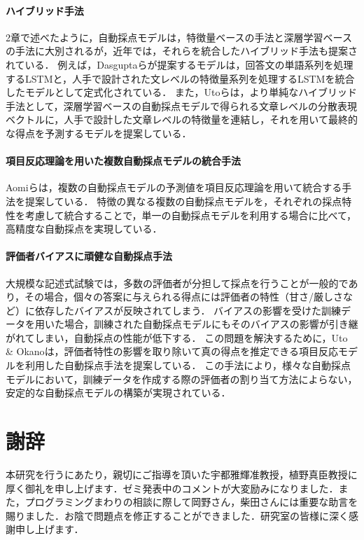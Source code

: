 \documentclass[a4paper,12pt,oneside,openany]{jsbook}
\begin{document}
\subsubsection*{ハイブリッド手法}

2章で述べたように，自動採点モデルは，特徴量ベースの手法と深層学習ベースの手法に大別されるが，近年では，それらを統合したハイブリッド手法も提案されている．
例えば，Dasguptaら\cite{Hybridmodel1}が提案するモデルは，回答文の単語系列を処理するLSTMと，人手で設計された文レベルの特徴量系列を処理するLSTMを統合したモデルとして定式化されている．
また，Utoら\cite{Hybridmodel2}は，より単純なハイブリッド手法として，深層学習ベースの自動採点モデルで得られる文章レベルの分散表現ベクトルに，人手で設計した文章レベルの特徴量を連結し，それを用いて最終的な得点を予測するモデルを提案している．

\subsubsection*{項目反応理論を用いた複数自動採点モデルの統合手法}

Aomiら\cite{asag6}\cite{aomi2}は，複数の自動採点モデルの予測値を項目反応理論を用いて統合する手法を提案している．
特徴の異なる複数の自動採点モデルを，それぞれの採点特性を考慮して統合することで，単一の自動採点モデルを利用する場合に比べて，高精度な自動採点を実現している．

\subsubsection*{評価者バイアスに頑健な自動採点手法}

大規模な記述式試験では，多数の評価者が分担して採点を行うことが一般的であり，その場合，個々の答案に与えられる得点には評価者の特性（甘さ/厳しさなど）に依存したバイアスが反映されてしまう．
バイアスの影響を受けた訓練データを用いた場合，訓練された自動採点モデルにもそのバイアスの影響が引き継がれてしまい，自動採点の性能が低下する．
この問題を解決するために，Uto \& Okano\cite{asag8,okano,okano2}は，評価者特性の影響を取り除いて真の得点を推定できる項目反応モデル\cite{okano3,okano4}を利用した自動採点手法を提案している．
この手法により，様々な自動採点モデルにおいて，訓練データを作成する際の評価者の割り当て方法によらない，安定的な自動採点モデルの構築が実現されている．

%
\chapter*{謝辞}
本研究を行うにあたり，親切にご指導を頂いた宇都雅輝准教授，植野真臣教授に厚く御礼を申し上げます．ゼミ発表中のコメントが大変励みになりました．また，プログラミングまわりの相談に際して岡野さん，柴田さんには重要な助言を賜りました．お陰で問題点を修正することができました．研究室の皆様に深く感謝申し上げます．
%
%


%
\newpage
\printindex
%
\end{document}

